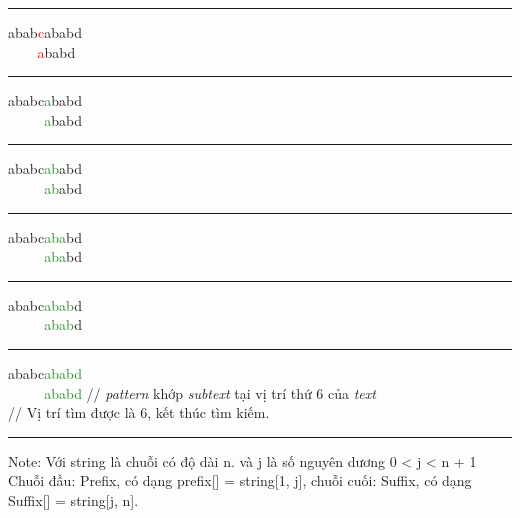 \documentclass[a4paper,11pt]{article}
\begin{document}
\begin{enumerate}
			\vspace*{2mm}
			\hrule
			abab\textcolor{red}{c}ababd\\
			\textcolor{white}{abab}\textcolor{red}{a}babd 		

			\vspace*{2mm}
			\hrule
			ababc\textcolor{ForestGreen}{a}babd\\
			\textcolor{white}{ababc}\textcolor{ForestGreen}{a}babd 

			\vspace*{2mm}
			\hrule
			ababc\textcolor{ForestGreen}{ab}abd\\
			\textcolor{white}{ababc}\textcolor{ForestGreen}{ab}abd 

			\vspace*{2mm}
			\hrule
			ababc\textcolor{ForestGreen}{aba}bd\\
			\textcolor{white}{ababc}\textcolor{ForestGreen}{aba}bd 

			\vspace*{2mm}
			\hrule
			ababc\textcolor{ForestGreen}{abab}d\\
			\textcolor{white}{ababc}\textcolor{ForestGreen}{abab}d 

			\vspace*{2mm}
			\hrule
			ababc\textcolor{ForestGreen}{ababd}\\
			\textcolor{white}{ababc}\textcolor{ForestGreen}{ababd} 				\hspace*{0.8cm} // \textit{pattern} khớp \textit{subtext} tại vị trí thứ 6 của \textit{text}\\
															\hspace*{2.9cm} // Vị trí tìm được là 6, kết thúc tìm kiếm.
			
			\vspace*{2mm}
			\hrule			
		
			Note: Với string là chuỗi có độ dài n. và j là số nguyên dương 0 < j < n + 1\\
			Chuỗi đầu: Prefix, có dạng prefix[] = string[1, j], chuỗi cuối: Suffix, có dạng Suffix[] = string[j, n].
				

\end{enumerate}
\end{document}
